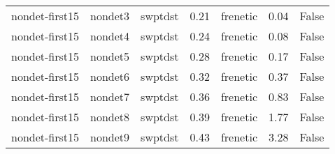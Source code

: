 \begin{tabular}{lllrlrr}
nondet-first15 & nondet3 & swptdst & 0.21 & frenetic & 0.04 & False \\
nondet-first15 & nondet4 & swptdst & 0.24 & frenetic & 0.08 & False \\
nondet-first15 & nondet5 & swptdst & 0.28 & frenetic & 0.17 & False \\
nondet-first15 & nondet6 & swptdst & 0.32 & frenetic & 0.37 & False \\
nondet-first15 & nondet7 & swptdst & 0.36 & frenetic & 0.83 & False \\
nondet-first15 & nondet8 & swptdst & 0.39 & frenetic & 1.77 & False \\
nondet-first15 & nondet9 & swptdst & 0.43 & frenetic & 3.28 & False \\
\bottomrule
\end{tabular}
